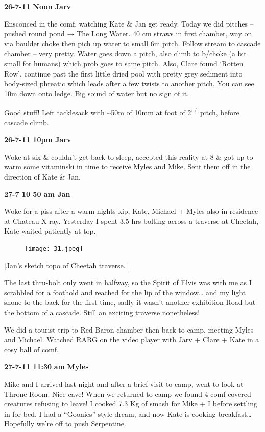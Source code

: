 \textbf{26-7-11 Noon Jarv}

Ensconced in the comf, watching Kate \& Jan get ready. Today we did
pitches -- pushed round pond → The Long Water. 40 cm straws in first
chamber, way on via boulder choke then pich up water to small 6m pitch.
Follow stream to cascade chamber -- very pretty. Water goes down a
pitch, also climb to b/choke (a bit small for humans) which prob goes to
same pitch. Also, Clare found `Rotten Row', continue past the first
little dried pool with pretty grey sediment into body-sized phreatic
which leads after a few twists to another pitch. You can see 10m down
onto ledge. Big sound of water but no sign of it.

Good stuff! Left tacklesack with \textasciitilde{}50m of 10mm at foot of
2\textsuperscript{nd} pitch, before cascade climb.

\textbf{26-7-11 10pm Jarv}

Woke at six \& couldn't get back to sleep, accepted this reality at 8 \&
got up to warm some vitaminski in time to receive Myles and Mike. Sent
them off in the direction of Kate \& Jan.

\textbf{27-7 10 50 am Jan}

Woke for a piss after a warm nights kip, Kate, Michael + Myles also in
residence at Chateau X-ray. Yesterday I spent 3.5 hrs bolting across a
traverse at Cheetah, Kate waited patiently at top.

\begin{figure}[htbp]
\centering
\texttt{[image: 31.jpeg]}
\caption{}
\end{figure}

{[}Jan's sketch topo of Cheetah traverse. {]}

The last thru-bolt only went in halfway, so the Spirit of Elvis was with
me as I scrabbled for a foothold and reached for the lip of the
window\ldots{} and my light shone to the back for the first time, sadly
it wasn't another exhibition Road but the bottom of a cascade. Still an
exciting traverse nonetheless!

We did a tourist trip to Red Baron chamber then back to camp, meeting
Myles and Michael. Watched RARG on the video player with Jarv + Clare +
Kate in a cosy ball of comf.

\textbf{27-7-11 11:30} \textbf{am} \textbf{Myles}

Mike and I arrived last night and after a brief visit to camp, went to
look at Throne Room. Nice cave! When we returned to camp we found 4
comf-covered creatures refusing to leave! I cooked 7.3 Kg of smash for
Mike + I before settling in for bed. I had a ``Goonies'' style dream,
and now Kate is cooking breakfast\ldots{} Hopefully we're off to push
Serpentine.


